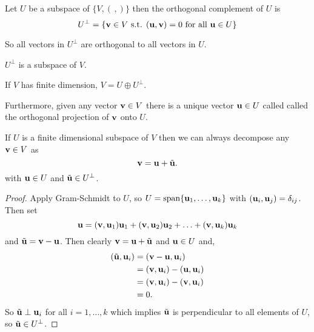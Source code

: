 \documentclass[10pt, a4paper]{article}
\begin{document}
\begin{definition}
    Let $U$ be a subspace of $\{V, (\,,)\}$ then the orthogonal complement of $U$ is
    \[
    U ^ {\perp} = \{\mathbf{v} \in V\text{ s.t. } (\mathbf{u}, \mathbf{v}) = 0\text{ for all } \mathbf{u} \in U\}
    \]
\end{definition}

So all vectors in $U ^ {\perp}$ are orthogonal to all vectors in $U$.

\begin{remark}
    $U ^ {\perp}$ is a subspace of $V$.
\end{remark}

\begin{remark}
    If $V$ has finite dimension,
    $V = U \oplus U ^ {\perp}$.
\end{remark}

Furthermore,
given any vector $\mathbf{v} \in V$ there is a unique vector $\mathbf{u} \in U$ called called the orthogonal projection of $\mathbf{v}$ onto $U$.

\begin{proposition}
    If $U$ is a finite dimensional subspace of $V$ then we can always decompose any $\mathbf{v} \in V$ as
    \[
    \mathbf{v} = \mathbf{u} + \Tilde{\mathbf{u}}.
    \]
    with $\mathbf{u} \in U$ and $\Tilde{\mathbf{u}} \in U ^ {\perp}$.

    \begin{proof}
        Apply Gram-Schmidt to $U$,
        so $U = \mathrm{span}\{\mathbf{u}_1, \dotsc, \mathbf{u}_k\}$ with $(\mathbf{u}_i, \mathbf{u}_j) = \delta_{ij}$.
        Then set
        \[
        \mathbf{u} = (\mathbf{v}, \mathbf{u}_1)\mathbf{u}_1 + (\mathbf{v}, \mathbf{u}_2)\mathbf{u}_2 + \dotsc + (\mathbf{v}, \mathbf{u}_k)\mathbf{u}_k
        \]
        and $\Tilde{\mathbf{u}} = \mathbf{v} - \mathbf{u}$.
        Then clearly $\mathbf{v} = \mathbf{u} + \Tilde{\mathbf{u}}$ and $\mathbf{u} \in U$ and,
        \begin{align*}
            (\Tilde{\mathbf{u}}, \mathbf{u}_i) &= (\mathbf{v} - \mathbf{u}, \mathbf{u}_i) \\
            &= (\mathbf{v}, \mathbf{u}_i) - (\mathbf{u}, \mathbf{u}_i) \\
            &= (\mathbf{v}, \mathbf{u}_i) - (\mathbf{v}, \mathbf{u}_i) \\
            &= 0.
        \end{align*}
        So $\Tilde{\mathbf{u}} \perp \mathbf{u}_i$ for all $i = 1, \dotsc, k$ which implies $\Tilde{\mathbf{u}}$ is perpendicular to all elements of $U$,
        so $\Tilde{\mathbf{u}} \in U ^ {\perp}$.
    \end{proof}
\end{proposition}
\end{document}
